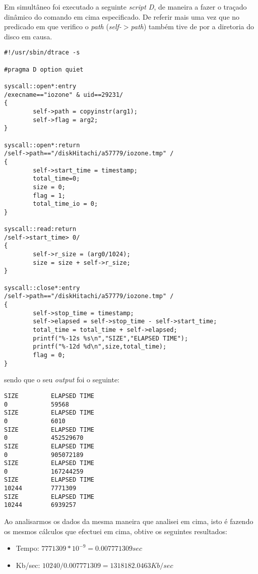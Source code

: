 \documentclass[conference,compsoc]{IEEEtran}
\begin{document}
Em simultâneo foi executado a seguinte \textit{script D}, de maneira a fazer o traçado dinâmico do comando em cima especificado. De referir mais uma vez que no predicado em que verifico o \textit{path} (\textit{self-$>$path}) também tive de por a diretoria do disco em causa.

 \begin{lstlisting}
#!/usr/sbin/dtrace -s

#pragma D option quiet

syscall::open*:entry
/execname=="iozone" & uid==29231/
{
        self->path = copyinstr(arg1);
        self->flag = arg2;
}

syscall::open*:return
/self->path=="/diskHitachi/a57779/iozone.tmp" /
{
        self->start_time = timestamp;
        total_time=0;
        size = 0;
        flag = 1;
        total_time_io = 0;
}

syscall::read:return
/self->start_time> 0/
{
        self->r_size = (arg0/1024);     
        size = size + self->r_size;
}

syscall::close*:entry
/self->path=="/diskHitachi/a57779/iozone.tmp" /
{
        self->stop_time = timestamp;
        self->elapsed = self->stop_time - self->start_time;
        total_time = total_time + self->elapsed; 
        printf("%-12s %s\n","SIZE","ELAPSED TIME");
        printf("%-12d %d\n",size,total_time);
        flag = 0;
}
\end{lstlisting}

sendo que o seu \textit{output} foi o seguinte:

\begin{lstlisting}
SIZE         ELAPSED TIME
0            59568
SIZE         ELAPSED TIME
0            6010
SIZE         ELAPSED TIME
0            452529670
SIZE         ELAPSED TIME
0            905072189
SIZE         ELAPSED TIME
0            167244259
SIZE         ELAPSED TIME
10244        7771309
SIZE         ELAPSED TIME
10244        6939257
\end{lstlisting}

Ao analisarmos os dados da mesma maneira que analisei em cima, isto é fazendo os mesmos cálculos que efectuei em cima, obtive os seguintes resultados: 

\begin{itemize}
\item Tempo: $7771309*10^{-9} = 0.007771309 sec$
\item Kb/sec: $10240/0.007771309=1318182.0463 Kb/sec$
\end{itemize}
\end{document}
